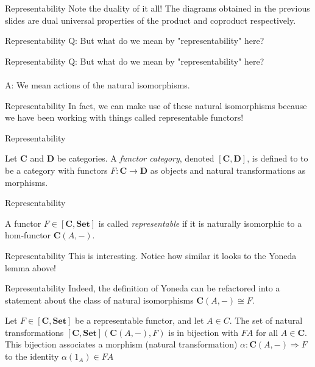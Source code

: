 \documentclass[tikz]{beamer}
\theoremstyle{definition}
\begin{document}
\begin{frame}{Representability}
    Note the duality of it all! The diagrams obtained in the previous slides are dual universal properties of the product and coproduct respectively.
\end{frame}

\begin{frame}{Representability}
    Q: But what do we mean by "representability" here? 
\end{frame}{}

\begin{frame}{Representability}
    Q: But what do we mean by "representability" here? 
    \\
    \\
    A: We mean actions of the natural isomorphisms. 
\end{frame}{}

\begin{frame}{Representability}
    In fact, we can make use of these natural isomorphisms because we have been working with things called representable functors!
\end{frame}{}

\begin{frame}{Representability}
    \begin{definition}
        Let $\mathbf{C}$ and $\mathbf{D}$ be categories. A \textit{functor category}, denoted $[\mathbf{C}, \mathbf{D}]$, is defined to to be a category with functors $F: \mathbf{C} \to \mathbf{D}$ as objects and natural transformations as  morphisms. 
    \end{definition}{}
\end{frame}{}

\begin{frame}{Representability}
    \begin{definition}
        A functor $F \in [\mathbf{C}, \mathbf{Set}]$ is called \textit{representable} if it is naturally isomorphic to a hom-functor $\mathbf{C}(A,-)$.
    \end{definition}{}
\end{frame}{}

\begin{frame}{Representability}
    This is interesting. Notice how similar it looks to the Yoneda lemma above!
\end{frame}{}

\begin{frame}{Representability}
    Indeed, the definition of Yoneda can be refactored into a statement about the class of natural isomorphisms $\mathbf{C}(A,-) \cong F$.
    
    \begin{definition}
        Let $F \in [\mathbf{C}, \mathbf{Set}]$ be a representable functor, and let $A \in C$. The set of natural transformations $[\mathbf{C}, \mathbf{Set}](\mathbf{C}(A,-), F)$ is in bijection with $FA$ for all $A \in \mathbf{C}$. This bijection associates a morphism (natural transformation) $\alpha: \mathbf{C}(A,-) \Rightarrow F$ to the identity $\alpha(1_A) \in FA$
    \end{definition}{}
\end{frame}{}
\end{document}
